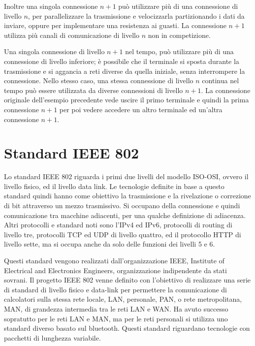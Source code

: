 \documentclass{article}
\numberwithin{equation}{subsection}
\begin{document}
Inoltre una singola connessione $n+1$ può utilizzare più di una connessione di livello $n$, per parallelizzare la trasmissione e velocizzarla partizionando i dati da 
inviare, oppure per implementare una resistenza ai guasti. La connessione $n+1$ utilizza più canali di comunicazione di livello $n$ non in competizione. 

Una singola connessione di livello $n+1$ nel tempo, può utilizzare più di una connessione di livello inferiore; è possibile che il terminale si sposta durante la 
trasmissione e si aggancia a reti diverse da quella iniziale, senza interrompere la connessione. 
Nello stesso caso, una stessa connessione di livello $n$ continua nel tempo può essere utilizzata da diverse connessioni di livello $n+1$. La connessione originale dell'esempio 
precedente vede uscire il primo terminale e quindi la prima connessione $n+1$ per poi vedere accedere un altro terminale ed un'altra connessione $n+1$. 

\clearpage

\section{Standard IEEE 802}

Lo standard IEEE 802 riguarda i primi due livelli del modello ISO-OSI, ovvero il livello fisico, ed il livello data link. Le tecnologie definite in base a questo standard quindi hanno come obiettivo la trasmissione 
e la rivelazione o correzione di bit attraverso un mezzo trasmissivo. Si occupano della connessione e quindi comunicazione tra macchine adiacenti, per una qualche definizione di adiacenza. Altri protocolli e standard 
noti sono l'IPv4 ed IPv6, protocolli di routing di livello tre, protocolli TCP ed UDP di livello quattro, ed il protocollo HTTP di livello sette, ma si occupa anche da solo delle funzioni dei livelli 5 e 6. 

Questi standard vengono realizzati dall'organizzazione IEEE, Institute of Electrical and Electronics Engineers, organizzazione indipendente da stati sovrani. Il progetto IEEE 802 venne definito con 
l'obiettivo di realizzare una serie di standard di livello fisico e data-link per permettere la comunicazione di calcolatori sulla stessa rete locale, LAN, personale, PAN, o rete metropolitana, MAN, di grandezza 
intermedia tra le reti LAN e WAN. Ha avuto successo sopratutto per le reti LAN e MAN, ma per le reti personali si utilizza uno standard diverso basato sul bluetooth. 
Questi standard riguardano tecnologie con pacchetti di lunghezza variabile.
\end{document}
